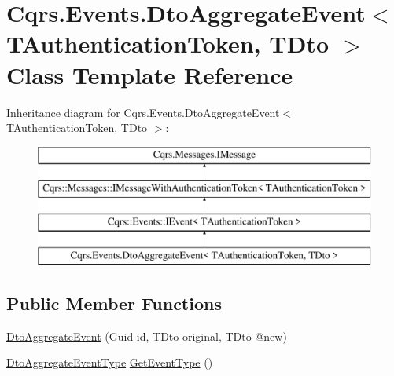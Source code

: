 \hypertarget{classCqrs_1_1Events_1_1DtoAggregateEvent}{}\section{Cqrs.\+Events.\+Dto\+Aggregate\+Event$<$ T\+Authentication\+Token, T\+Dto $>$ Class Template Reference}
\label{classCqrs_1_1Events_1_1DtoAggregateEvent}
Inheritance diagram for Cqrs.\+Events.\+Dto\+Aggregate\+Event$<$ T\+Authentication\+Token, T\+Dto $>$\+:\begin{figure}[H]
\begin{center}
\leavevmode
\includegraphics[height=4.000000cm]{classCqrs_1_1Events_1_1DtoAggregateEvent}
\end{center}
\end{figure}
\subsection*{Public Member Functions}
\begin{DoxyCompactItemize}
\item 
\hyperlink{classCqrs_1_1Events_1_1DtoAggregateEvent_a9741e3dae73892ee98408547ea953d4d_a9741e3dae73892ee98408547ea953d4d}{Dto\+Aggregate\+Event} (Guid id, T\+Dto original, T\+Dto @new)
\item 
\hyperlink{namespaceCqrs_1_1Events_a2a32e13adeac92f5a93966cd8ee2d39a_a2a32e13adeac92f5a93966cd8ee2d39a}{Dto\+Aggregate\+Event\+Type} \hyperlink{classCqrs_1_1Events_1_1DtoAggregateEvent_af5bed152d656cb758312f499f87e69de_af5bed152d656cb758312f499f87e69de}{Get\+Event\+Type} ()
\end{DoxyCompactItemize}
